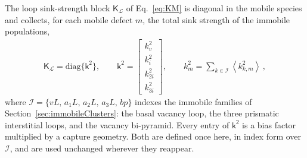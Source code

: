 \documentclass{article}
\newcommand{\spvec}[1]{\bm{\mathsf{#1}}}   %
\newcommand{\spmat}[1]{\bm{\mathsf{#1}}}   %
\begin{document}
The loop sink-strength block $\spmat{K}_{\mathcal L}$ of Eq.~\eqref{eq:KM} is diagonal in the mobile species and collects, for each mobile defect $m$, the total sink strength of the immobile populations,
\begin{align}\label{eq:KL_matrix}
\spmat{K}_{\mathcal L}=\mathrm{diag}\{\spvec{k}^2\},\qquad
\spvec{k}^2=\begin{bmatrix} k_v^2 \\ k_i^2 \\ k_{2i}^2 \\ k_{3i}^2 \end{bmatrix},\qquad
k_m^2=\sum_{k\in\mathcal{I}}\left\langle k^2_{k,m}\right\rangle\, ,
\end{align}
where $\mathcal{I}=\{vL,\,a_1L,\,a_2L,\,a_3L,\,bp\}$ indexes the immobile families of Section~\ref{sec:immobileClusters}: the basal vacancy loop, the three prismatic interstitial loops, and the vacancy bi-pyramid. Every entry of $\spvec{k}^2$ is a bias factor multiplied by a capture geometry. Both are defined once here, in index form over $\mathcal{I}$, and are used unchanged wherever they reappear.
\end{document}
